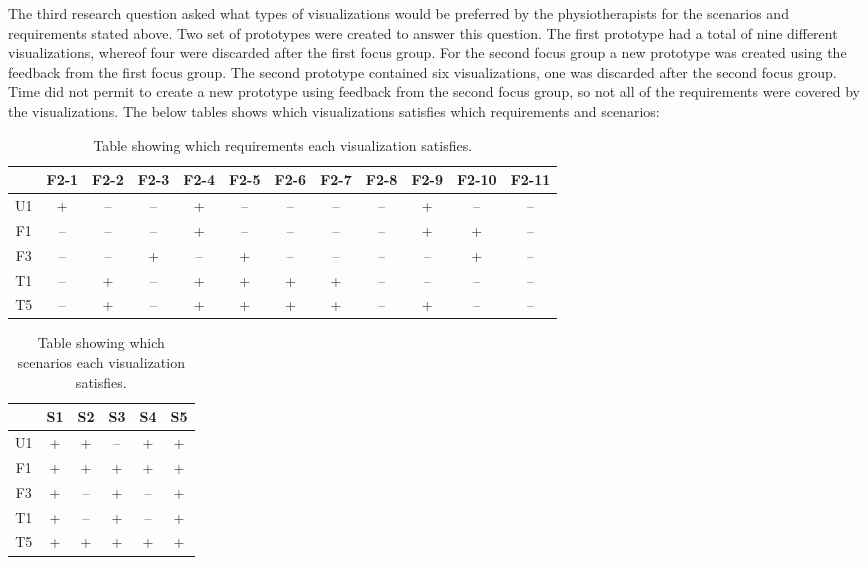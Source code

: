 The third research question asked what types of visualizations would be preferred by the physiotherapists for the scenarios and requirements stated above. Two set of prototypes were created to answer this question. The first prototype had a total of nine different visualizations, whereof four were discarded after the first focus group. For the second focus group a new prototype was created using the feedback from the first focus group. The second prototype contained six visualizations, one was discarded after the second focus group. Time did not permit to create a new prototype using feedback from the second focus group, so not all of the requirements were covered by the visualizations. The below tables shows which visualizations satisfies which requirements and scenarios:

\begin{table}[h!]
  \centering
  \begin{tabular}{|c|c|c|c|c|c|c|c|c|c|c|c|}
    \hline
    & F2-1 & F2-2 & F2-3 & F2-4 & F2-5 & F2-6 & F2-7 & F2-8 & F2-9 & F2-10 & F2-11 \\ \hline
    U1 & + & -- & -- & + & -- & -- & -- & -- & + & -- & -- \\ \hline
    F1 & -- & -- & -- & + & -- & -- & -- & -- & + & + & -- \\ \hline
    F3 & -- & -- & + & -- & + & -- & -- & -- & -- & + & -- \\ \hline
    T1 & -- & + & -- & + & + & + & + & -- & -- & -- & -- \\ \hline
    T5 & -- & + & -- & + & + & + & + & -- & + & -- & -- \\ \hline
  \end{tabular}
  \caption{Table showing which requirements each visualization satisfies.}
  \label{tab:reqSat}
\end{table} 

\begin{table}[h!]
  \centering
  \begin{tabular}{|c|c|c|c|c|c|}
    \hline
       & S1 & S2 & S3 & S4 & S5 \\ \hline
    U1 & +  & +  & -- & +  & +  \\ \hline
    F1 & +  & +  & +  & +  & +  \\ \hline
    F3 & +  & -- & +  & -- & +  \\ \hline
    T1 & +  & -- & +  & -- & +  \\ \hline
    T5 & +  & +  & +  & +  & +  \\ \hline
  \end{tabular}
  \caption{Table showing which scenarios each visualization satisfies.}
  \label{tab:scenSet}
\end{table}

